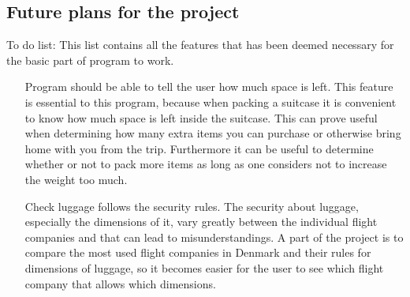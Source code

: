 \subsection{Future plans for the project}


To do list:
This list contains all the features that has been deemed necessary for the basic part of program to work.

\begin{itemize}
\item[Program should be able to tell the user how much space is left.]
This feature is essential to this program, because when packing a suitcase it is convenient to know how much space is left inside the suitcase. This can prove useful when determining how many extra items you can purchase or otherwise bring home with you from the trip. Furthermore it can be useful to determine whether or not to pack more items as long as one considers not to increase the weight too much.

\item[Check luggage follows the security rules.]
The security about luggage, especially the dimensions of it, vary greatly between the individual flight companies and that can lead to misunderstandings. A part of the project is to compare the most used flight companies in Denmark and their rules for dimensions of luggage, so it becomes easier for the user to see which flight company that allows which dimensions. 
\end{itemize}

